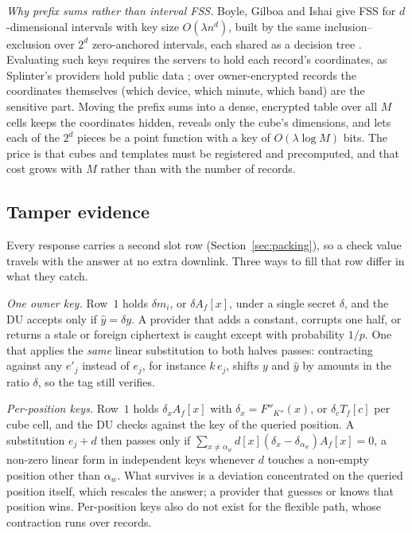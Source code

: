 \documentclass[a4paper,fleqn]{cas-sc}
\begin{document}
\emph{Why prefix sums rather than interval FSS.} Boyle, Gilboa and Ishai
give FSS for $d$-dimensional intervals with key size $O(\lambda n^d)$, built by
the same inclusion--exclusion over $2^d$ zero-anchored intervals, each shared
as a decision tree \citep[\S3.3, Cor.~3.4]{boyle2016function}. Evaluating such
keys requires the servers to hold each record's coordinates, as Splinter's
providers hold public data \citep{splinter}; over owner-encrypted records the
coordinates themselves (which device, which minute, which band) are the
sensitive part. Moving the prefix sums into a dense, encrypted table over all
$M$ cells keeps the coordinates hidden, reveals only the cube's dimensions, and
lets each of the $2^d$ pieces be a point function with a key of
$O(\lambda\log M)$ bits. The price is that cubes and templates must be
registered and precomputed, and that cost grows with $M$ rather than with the
number of records.


\subsection{Tamper evidence}
\label{sec:verify}
Every response carries a second slot row (Section~\ref{sec:packing}), so a
check value travels with the answer at no extra downlink. Three ways to fill
that row differ in what they catch.

\emph{One owner key.} Row~$1$ holds $\delta m_i$, or $\delta A_f[x]$, under a
single secret $\delta$, and the DU accepts only if $\hat y=\delta y$. A provider
that adds a constant, corrupts one half, or returns a stale or foreign
ciphertext is caught except with probability $1/p$. One that applies the
\emph{same} linear substitution to both halves passes: contracting against any
$e'_j$ instead of $e_j$, for instance $k\,e_j$, shifts $y$ and $\hat y$ by
amounts in the ratio $\delta$, so the tag still verifies.

\emph{Per-position keys.} Row~$1$ holds $\delta_xA_f[x]$ with
$\delta_x=F''_{K''}(x)$, or $\delta_cT_f[c]$ per cube cell, and the DU checks
against the key of the queried position. A substitution $e_j+d$ then passes
only if $\sum_{x\neq\alpha_w}d[x](\delta_x-\delta_{\alpha_w})A_f[x]=0$, a
non-zero linear form in independent keys whenever $d$ touches a non-empty
position other than $\alpha_w$. What survives is a deviation concentrated on
the queried position itself, which rescales the answer; a provider that guesses
or knows that position wins. Per-position keys also do not exist for the
flexible path, whose contraction runs over records.
\end{document}
